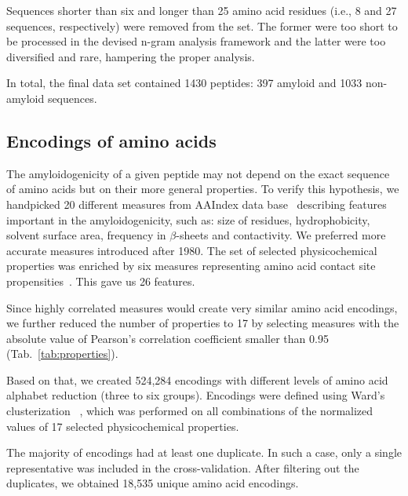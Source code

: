 \documentclass[fleqn,10pt,twoside]{gcb15submission}
\begin{document}
  Sequences shorter than six and longer than 25 amino acid residues (i.e., 8 and 
27 sequences, respectively) were removed from the set. The former were too short 
to be processed in the devised n-gram analysis framework and the latter were too 
diversified and rare, hampering the proper analysis.

  In total, the final data set contained 1430 peptides: 397 amyloid
and 1033 non-amyloid sequences. 

\subsection{Encodings of amino acids}

The amyloidogenicity of a given peptide may not depend on the exact sequence of 
amino acids but on their more general properties. To verify this hypothesis, we 
handpicked 20 different measures from AAIndex data base~\citep{kawashima_aaindex:_2008} 
describing features important in the amyloidogenicity, such as: size of 
residues, hydrophobicity, solvent surface area, frequency in $\beta$-sheets and 
contactivity. We preferred more accurate measures introduced after 1980. 
The set of selected physicochemical properties was enriched by 
six measures representing amino acid contact site 
propensities~\cite{wozniak_characteristics_2014}. This gave us  26 features.

  Since highly correlated measures would create very similar amino acid 
encodings, we further reduced the number of properties to 17 by selecting 
measures with the absolute value of Pearson's correlation coefficient smaller 
than 0.95 (Tab.~\ref{tab:properties}). 

  Based on that, we created 524,284 encodings with different levels of amino 
acid alphabet reduction (three to six groups). Encodings were defined using 
Ward's clusterization ~\citep{joe_h._ward_jr_hierarchical_1963}, which was 
performed on all combinations of the normalized values of 17 selected 
physicochemical properties.

  The majority of encodings had at least one duplicate. In such a case, only a 
single representative was included in the cross-validation. After filtering out the 
duplicates, we obtained 18,535 unique amino acid encodings.
\end{document}

